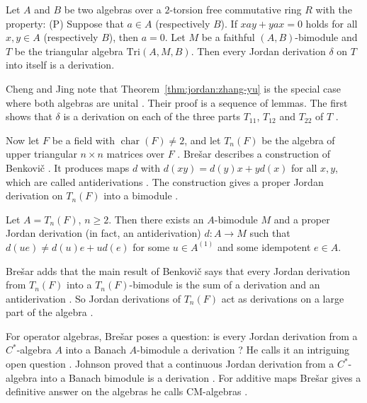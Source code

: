 \begin{theorem}\label{thm:jordan:cheng-jing}
Let $A$ and $B$ be two algebras over a $2$-torsion free commutative ring $R$ with the property:
(P) Suppose that $a\in A$ (respectively $B$). If $xay+yax=0$ holds for all $x,y\in A$ (respectively $B$),
then $a=0$. Let $M$ be a faithful $(A,B)$-bimodule and $T$ be the triangular algebra
$\mathrm{Tri}(A,M,B)$. Then every Jordan derivation $\delta$ on $T$ into itself is a derivation.
\end{theorem}

Cheng and Jing note that Theorem~\ref{thm:jordan:zhang-yu} is the special case where both
algebras are unital \cite[Remark~2.11, p.~5]{ChengJing2007}. Their proof is a sequence of lemmas.
The first shows that $\delta$ is a derivation on each of the three parts $T_{11}$, $T_{12}$ and $T_{22}$
of $T$ \cite[pp.~4--5]{ChengJing2007}.

Now let $F$ be a field with
$\operatorname{char}(F)\neq2$, and let $T_n(F)$ be the algebra of upper triangular $n\times n$
matrices over $F$ \cite[Section~4, p.~418]{Bresar2005}. Brešar describes a construction of
Benkovič \cite[\S4.1, p.~418]{Bresar2005}. It produces maps $d$ with $d(xy)=d(y)x+yd(x)$ for all $x,y$, which are called
antiderivations \cite[\S4.1, p.~418]{Bresar2005}. The construction gives a proper Jordan derivation
on $T_n(F)$ into a bimodule \cite[\S4.1, p.~418]{Bresar2005}.

\begin{example}\label{ex:jordan:benkovic-tn}
Let $A=T_n(F)$, $n\geqslant2$. Then there exists an $A$-bimodule $M$ and a proper Jordan derivation
(in fact, an antiderivation) $d\colon A\to M$ such that $d(ue)\neq d(u)e+ud(e)$ for some
$u\in A^{(1)}$ and some idempotent $e\in A$.
\end{example}

Brešar adds that the main result of Benkovič says that every Jordan derivation from $T_n(F)$ into a
$T_n(F)$-bimodule is the sum of a derivation and an antiderivation \cite[p.~419]{Bresar2005}. So
Jordan derivations of $T_n(F)$ act as derivations on a large part of the algebra
\cite[p.~419]{Bresar2005}.

For operator algebras, Brešar poses a question: is every Jordan derivation from a
$C^{*}$-algebra $A$ into a Banach $A$-bimodule a derivation \cite[Section~5, p.~421]{Bresar2005}?
He calls it an intriguing open question \cite[Section~5, p.~421]{Bresar2005}. Johnson proved that a
continuous Jordan derivation from a $C^{*}$-algebra into a Banach bimodule is a derivation
\cite[p.~421]{Bresar2005}. For additive maps Brešar gives a definitive answer on the algebras he
calls $\mathrm{CM}$-algebras \cite[p.~421]{Bresar2005}.

